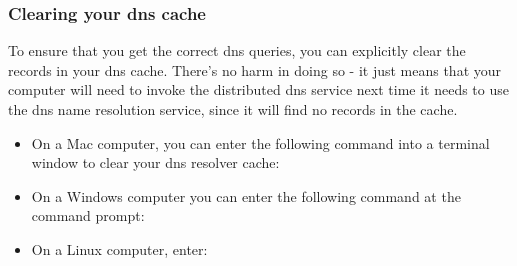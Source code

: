 \subsubsection{Clearing your \ac{dns} cache}
To ensure that you get the correct \ac{dns} queries, you can explicitly clear the records in your \ac{dns} cache.  There's no harm in doing so - it just means that your computer will need to invoke the distributed \ac{dns} service next time it needs to use the \ac{dns} name resolution service, since it will find no records in the cache.  
\begin{itemize}
\item On a Mac computer, you can enter the following command into a terminal window to clear your \ac{dns} resolver cache:
\begin{cmdblock}[gobble=1]
\end{cmdblock}

\item On a Windows computer you can enter the following command at the command prompt:
\begin{cmdblock}[gobble=1]
\end{cmdblock}

\item On a Linux computer, enter:
\begin{cmdblock}[gobble=1]
\end{cmdblock}
\end{itemize}

